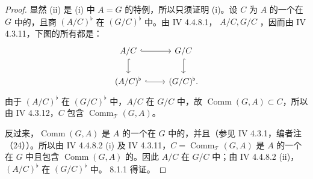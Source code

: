 \begin{proof}
显然 (ii) 是 (i) 中 $A=G$ 的特例，所以只须证明 (i)。设 $C$ 为 $A$ 的一个在 $G$ 中的，且商 $(A/C)^\flat$ 在 $(G/C)^\flat$ 中。由 IV 4.4.8.1， $A/C,G/C$ ，因而由 IV 4.3.11，下图的所有都是：
\[
\begin{tikzcd}
A/C\arrow[r,hook]\arrow[d,hook] & G/C\arrow[d,hook]\\
(A/C)^\flat\arrow[r,hook] &(G/C)^\flat.
\end{tikzcd}
\]
由于 $(A/C)^\flat$ 在 $(G/C)^\flat$ 中，$A/C$ 在 $G/C$ 中，故 $\operatorname{Comm}(G,A)\subset C$，所以由 IV 4.3.12，$C$ 包含 $\operatorname{Comm}_{\mathscr T}(G,A)$。

反过来，$\operatorname{Comm}(G,A)$ 是 $A$ 的一个在 $G$ 中的，并且（参见 IV 4.3.1，编者注（24））。所以由 IV 4.4.8.2 (i) 及 IV 4.3.11，$C=\operatorname{Comm}_{\mathscr T}(G,A)$ 是 $A$ 的一个在 $G$ 中且包含 $\operatorname{Comm}(G,A)$ 的。因此 $A/C$ 在 $G/C$ 中；由 IV 4.4.8.2 (ii)，$(A/C)^\flat$ 在 $(G/C)^\flat$ 中。 8.1.1 得证。
\end{proof}

